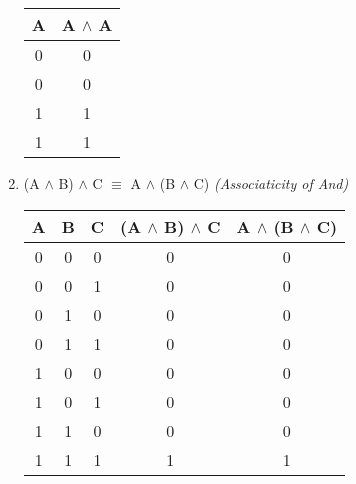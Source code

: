 \documentclass{report}
\begin{document}
\begin{enumerate}
\begin{center}
\begin{tabular}{| c | c |}
    \hline

    A & A $\land$ A \\ \hline

    0 & 0 \\

    0 & 0 \\

    1 & 1 \\

    1 & 1 \\ \hline

  \end{tabular}

\end{center}



  \item (A $\land$ B) $\land$ C $\equiv$ A $\land$ (B $\land$ C) \emph{(Associaticity of And)}



\begin{center}

  \begin{tabular}{| c | c | c | c | c |}

    \hline

    A & B & C & (A $\land$ B) $\land$ C & A $\land$ (B $\land$ C) \\ \hline

    0 & 0 & 0 & 0 & 0 \\

    0 & 0 & 1 & 0 & 0 \\

    0 & 1 & 0 & 0 & 0 \\

    0 & 1 & 1 & 0 & 0 \\

    1 & 0 & 0 & 0 & 0 \\

    1 & 0 & 1 & 0 & 0 \\

    1 & 1 & 0 & 0 & 0 \\

    1 & 1 & 1 & 1 & 1 \\ \hline

  \end{tabular}

\end{center}

\end{enumerate}
\end{document}
